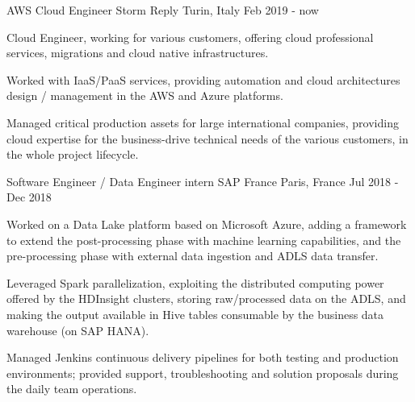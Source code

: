 

\begin{cventries}

  \cventry
    {AWS Cloud Engineer} %
    {Storm Reply} %
    {Turin, Italy} %
    {Feb 2019 - now} %
    {
        \begin{cvitems} %
            \item {Cloud Engineer, working for various customers, offering cloud professional services, migrations and cloud native infrastructures.}
            \item {Worked with IaaS/PaaS services, providing automation and cloud architectures design / management in the AWS and Azure platforms.}
            \item {Managed critical production assets for large international companies, providing cloud expertise for the business-drive technical needs of the various customers, in the whole project lifecycle.}
        \end{cvitems}
    }

  \cventry
    {Software Engineer / Data Engineer intern} %
    {SAP France} %
    {Paris, France} %
    {Jul 2018 - Dec 2018} %
    {
      \begin{cvitems} %
        \item {Worked on a Data Lake platform based on Microsoft Azure, adding a framework to extend the post-processing phase with machine learning capabilities, and the pre-processing phase with external data ingestion and ADLS data transfer.}
        \item {Leveraged Spark parallelization, exploiting the distributed computing power offered by the HDInsight clusters, storing raw/processed data on the ADLS, and making the output available in Hive tables consumable by the business data warehouse (on SAP HANA).}
        \item {Managed Jenkins continuous delivery pipelines for both testing and production environments; provided support, troubleshooting and solution proposals during the daily team operations.}
      \end{cvitems}
    }
\end{cventries}
